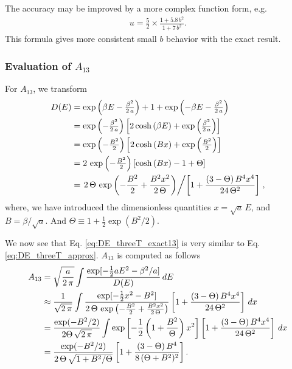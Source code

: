 \documentclass[aip,jcp,preprint,notitlepage, superscriptaddress]{revtex4-1}
\begin{document}
The accuracy may be improved
by a more complex function form, e.g.
%
\begin{align*}
u = \frac 5 2
\times
\frac{1+5.8 \, b^2}{1 + 7 \, b^2}.
\end{align*}
%
This formula gives more consistent
small $b$ behavior with the exact result.





\subsubsection{Evaluation of $A_{13}$}



For $A_{13}$,
we transform
\begin{align}
D(E)
&=
\exp\left(
  \beta E - \tfrac{ \beta^2 }{ 2 \, a }
\right)
+
1
+
\exp\left(
  -\beta E - \tfrac{ \beta^2 }{ 2 \, a }
\right)
\notag \\
&=
\exp\left(
  -\tfrac{ \beta^2 } { 2 \, a }
\right)
\left[
2 \cosh\left(
  \beta E
\right)
+
\exp\left(
  \tfrac{ \beta^2 } { 2 \, a }
\right)
\right]
\notag \\
&=
\exp\left(
  -\tfrac{ B^2 } { 2 }
\right)
\left[
2 \cosh\left(
  B x
\right)
+
\exp\left(
  \tfrac{ B^2 } { 2 }
\right)
\right]
\notag \\
&=
2 \, \exp\left(
  -\tfrac{ B^2 } { 2 }
\right)
\left[
\cosh\left(
  B x
\right)
-1
+
\Theta
\right]
\notag \\
&=
\left.
2 \, \Theta \, \exp\left(
  -\frac{ B^2 } { 2 }
  +\frac{ B^2 x^2 } { 2 \, \Theta }
\right)
\middle/
\left[
  1 +
  \frac{(3 - \Theta) \, B^4 x^4 }
  { 24 \, \Theta^2 }
\right]
\right.,
\label{eq:DE_threeT_exact13}
\end{align}
%
where,
we have introduced
the dimensionless quantities
$x = \sqrt{a} \, E$,
and
$B = \beta / \sqrt{a}$.
And
$\Theta \equiv 1 + \frac{1}{2} \exp(B^2/2)$.



We now see that
Eq. \eqref{eq:DE_threeT_exact13}
is very similar to
Eq. \eqref{eq:DE_threeT_approx}.
%
$A_{13}$ is computed as follows
%
\begin{align}
A_{13}
&=
\sqrt{ \frac a {2 \, \pi} }
\int
  \frac{ \exp[-\frac 1 2 a E^2 - \beta^2/a ] }
  { D(E) } \, dE
\notag \\
&\approx
\frac {1 }{ \sqrt{2 \, \pi} }
\int
  \frac{ \exp[-\frac 1 2 x^2 - B^2 ] }
  {
    2 \, \Theta \, \exp\left(
      -\frac{ B^2 } { 2 }
      +\frac{ B^2 x^2 } { 2 \, \Theta }
    \right)
  }
  \left[
    1
    +
    \frac{ (3 - \Theta) \, B^4 x^4 }
    { 24 \, \Theta^2 }
  \right]
 \, d x
\notag \\
&=
\frac { \exp(-B^2/2) }
{ 2 \Theta \, \sqrt{2 \, \pi} }
\int
  \exp\left[
    -\frac 1 2
    \left(
      1 + \frac{ B^2 } { \Theta }
    \right)
    x^2
  \right]
  \left[
    1
    +
    \frac{ (3 - \Theta) \, B^4 x^4 }
    { 24 \, \Theta^2 }
  \right]
 \, d x
\notag \\
&=
\frac { \exp(-B^2/2) }
{ 2 \, \Theta \, \sqrt{1 + B^2/\Theta} }
  \left[
    1
    +
    \frac{ (3 - \Theta) \, B^4 }
    { 8 \, (\Theta + B^2)^2}
  \right].
\end{align}
\end{document}
